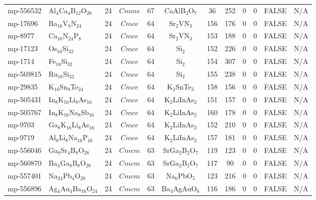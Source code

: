 {\begin{longtable}{llcccccccccc}
    mp-556532 & Al$_{4}$Ca$_{4}$B$_{12}$O$_{28}$ & 24    & $Cmme$ & 67    & CaAlB$_{3}$O$_{7}$ & 36    & 252   & 0     & 0     & FALSE & N/A \\
    mp-17696 & Ba$_{16}$V$_{8}$N$_{24}$ & 24    & $Cmce$ & 64    & Sr$_{2}$VN$_{3}$ & 156   & 176   & 0     & 0     & FALSE & N/A \\
    mp-8977 & Ca$_{16}$N$_{24}$P$_{8}$ & 24    & $Cmce$ & 64    & Sr$_{2}$VN$_{3}$ & 153   & 188   & 0     & 0     & FALSE & N/A \\
    mp-17123 & Os$_{16}$Si$_{32}$ & 24    & $Cmce$ & 64    & Si$_{2}$ & 152   & 226   & 0     & 0     & FALSE & N/A \\
    mp-1714 & Fe$_{16}$Si$_{32}$ & 24    & $Cmce$ & 64    & Si$_{2}$ & 154   & 307   & 0     & 0     & FALSE & N/A \\
    mp-569815 & Ru$_{16}$Si$_{32}$ & 24    & $Cmce$ & 64    & Si$_{2}$ & 155   & 238   & 0     & 0     & FALSE & N/A \\
    mp-29835 & K$_{16}$Sn$_{8}$Te$_{24}$ & 24    & $Cmce$ & 64    & K$_{2}$SnTe$_{3}$ & 158   & 156   & 0     & 0     & FALSE & N/A \\
    mp-505431 & In$_{8}$K$_{16}$Li$_{8}$As$_{16}$ & 24    & $Cmce$ & 64    & K$_{2}$LiInAs$_{2}$ & 151   & 157   & 0     & 0     & FALSE & N/A \\
    mp-505767 & In$_{8}$K$_{16}$Na$_{8}$Sb$_{16}$ & 24    & $Cmce$ & 64    & K$_{2}$LiInAs$_{2}$ & 160   & 178   & 0     & 0     & FALSE & N/A \\
    mp-9703 & Ga$_{8}$K$_{16}$Li$_{8}$As$_{16}$ & 24    & $Cmce$ & 64    & K$_{2}$LiInAs$_{2}$ & 152   & 210   & 0     & 0     & FALSE & N/A \\
    mp-9719 & Al$_{8}$Li$_{8}$Na$_{16}$P$_{16}$ & 24    & $Cmce$ & 64    & K$_{2}$LiInAs$_{2}$ & 157   & 181   & 0     & 0     & FALSE & N/A \\
    mp-556046 & Ga$_{8}$Sr$_{4}$B$_{8}$O$_{28}$ & 24    & $Cmcm$ & 63    & SrGa$_{2}$B$_{2}$O$_{7}$ & 119   & 123   & 0     & 0     & FALSE & N/A \\
    mp-560870 & Ba$_{4}$Ga$_{8}$B$_{8}$O$_{28}$ & 24    & $Cmcm$ & 63    & SrGa$_{2}$B$_{2}$O$_{7}$ & 117   & 90    & 0     & 0     & FALSE & N/A \\
    mp-557401 & Na$_{24}$Pb$_{4}$O$_{20}$ & 24    & $Cmcm$ & 63    & Na$_{6}$PbO$_{5}$ & 123   & 216   & 0     & 0     & FALSE & N/A \\
    mp-556896 & Ag$_{4}$Au$_{4}$Ba$_{16}$O$_{24}$ & 24    & $Cmcm$ & 63    & Ba$_{4}$AgAuO$_{6}$ & 116   & 186   & 0     & 0     & FALSE & N/A \\

\end{longtable}}
